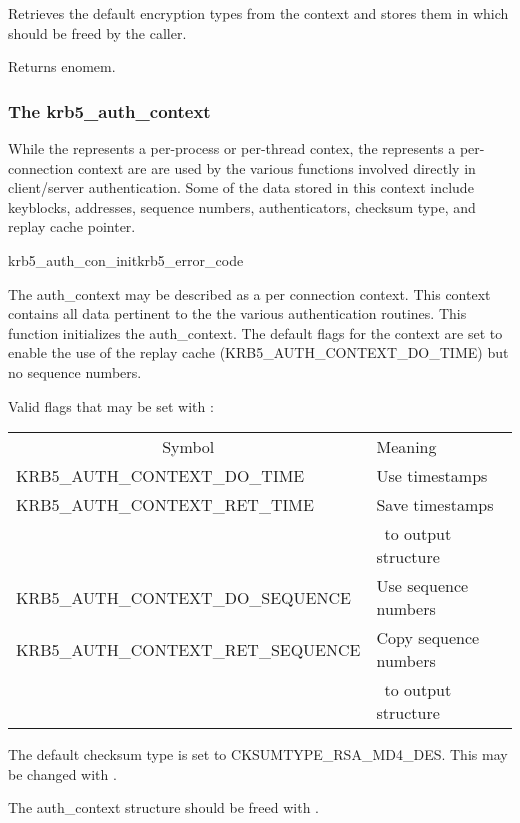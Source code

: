 Retrieves the default encryption types from the context and stores them
in  which should be freed by the caller.

Returns {\sc enomem}.

\subsubsection{The krb5_auth_context}

While the  represents a per-process or per-thread
contex, the  represents a per-connection
context are are used by the various functions involved directly in
client/server authentication.  Some of the data stored in this context
include keyblocks, addresses, sequence numbers, authenticators, checksum
type, and replay cache pointer. 

\begin{funcdecl}{krb5_auth_con_init}{krb5_error_code}{\funcinout}
\funcout
{}
\end{funcdecl}

The auth_context may be described as a per connection context. This
context contains all data pertinent to the the various authentication
routines. This function initializes the auth_context. The default flags
for the context are set to enable the use of the replay cache
(KRB5_AUTH_CONTEXT_DO_TIME) but no sequence numbers. 

Valid flags that may be set with :

\begin{tabular}{ll}
\multicolumn{1}{c}{Symbol} & Meaning \\
KRB5_AUTH_CONTEXT_DO_TIME & Use timestamps \\
KRB5_AUTH_CONTEXT_RET_TIME & Save timestamps\\ &\  to output structure\\
KRB5_AUTH_CONTEXT_DO_SEQUENCE	& Use sequence numbers \\
KRB5_AUTH_CONTEXT_RET_SEQUENCE	& Copy sequence numbers \\ &\ to output structure\\
\end{tabular}

The default checksum type is set to CKSUMTYPE_RSA_MD4_DES. This may be
changed with .

The auth_context structure should be freed with
.

